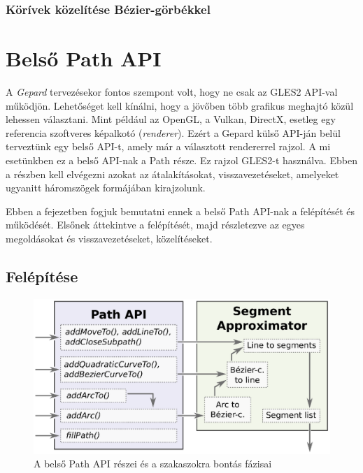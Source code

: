 \documentclass[12pt]{report}
\theoremstyle{definition}
\newcommand{\inenglish}[1]{\textsl{#1}}
\begin{document}
    \subsection{Körívek közelítése Bézier-görbékkel}
    \label{}


    \chapter{Belső Path API}

  A \emph{Gepard} tervezésekor fontos szempont volt, hogy ne csak az
GLES2 API-val működjön. Lehetőséget kell kínálni, hogy a jövőben
több grafikus meghajtó közül lehessen választani. Mint például
az OpenGL, a Vulkan, DirectX, esetleg egy referencia szoftveres
képalkotó (\inenglish{renderer}). Ezért a Gepard külső API-ján
belül terveztünk egy belső API-t, amely már a választott
rendererrel rajzol. A mi esetünkben ez a belső API-nak a Path
része. Ez rajzol GLES2-t használva. Ebben a részben kell elvégezni
azokat az átalakításokat, visszavezetéseket, amelyeket ugyanitt
háromszögek formájában kirajzolunk.

  Ebben a fejezetben fogjuk bemutatni ennek a belső Path API-nak a
felépítését és működését. Elsőnek áttekintve a
felépítését, majd részletezve az egyes megoldásokat és
visszavezetéseket, közelítéseket.

    \section[Felépítése]{Felépítése}
    \label{Felépítése}

    \begin{figure}
    \begin{center}
      \includegraphics[scale=0.6]{img/dataflow_path_api_eps}
    \end{center}
      \caption{\label{dataflow-path-API-diagram} A belső Path API
      részei és a szakaszokra bontás fázisai}
    \end{figure}
\end{document}
